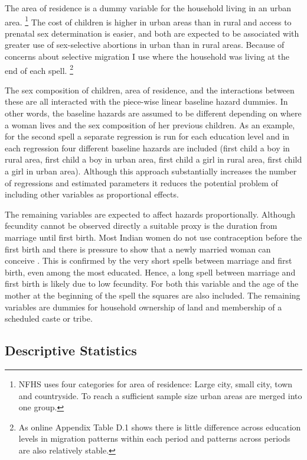 \documentclass[12pt,letterpaper]{article}
\begin{document}
The area of residence is a dummy variable for the household living in
an urban area.%
\footnote{
NFHS uses four categories for area of residence: Large city, small city, town
and countryside.
To reach a sufficient sample size urban areas are merged into one group.
}
The cost of children is higher in urban areas than in rural and access to prenatal
sex determination is easier, and both are expected to be associated with
greater use of sex-selective abortions in urban than in rural areas.
Because of concerns about selective migration I use where the household was living
at the end of each spell.%
\footnote{
As online Appendix Table D.1 shows there is little difference across
education levels in migration patterns within each period and patterns across periods
are also relatively stable.
}

The sex composition of children, area of residence, and the interactions between
these are all interacted with the piece-wise linear baseline hazard dummies.
In other words, the baseline hazards are assumed to be different depending on
where a woman lives and the sex composition of her previous children.
As an example, for the second spell a separate regression is
run for each education level and in each regression four different baseline hazards 
are included (first child a boy in rural area, first child a boy in urban area,
first child a girl in rural area, first child a girl in urban area).
Although this approach substantially increases the number of regressions and 
estimated parameters it reduces the potential problem of including other variables 
as proportional effects.

The remaining variables are expected to affect hazards proportionally.
Although fecundity cannot be observed directly a suitable
proxy is the duration from marriage until first birth.
Most Indian women do not use contraception before the first birth
and there is pressure to show that a newly married woman can conceive 
\citep{dyson83,Sethuraman2007,Dommaraju2009}.
This is confirmed by the very short spells between marriage and first birth,
even among the most educated.
Hence, a long spell between marriage and first birth is likely due to low fecundity.
For both this variable and the age of the mother at the beginning of the spell 
the squares are also included.
The remaining variables are dummies for household ownership of land and membership
of a scheduled caste or tribe.


\subsection{Descriptive Statistics}
\end{document}
